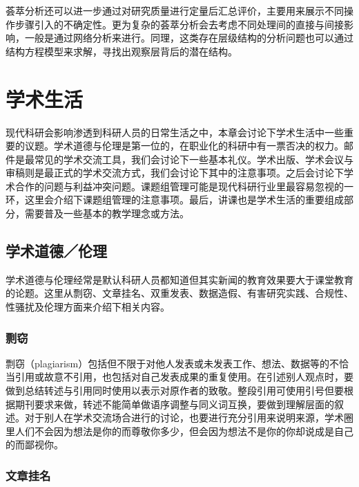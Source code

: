 \documentclass[]{tufte-book}
\begin{document}
荟萃分析还可以进一步通过对研究质量进行定量后汇总评价，主要用来展示不同操作步骤引入的不确定性。更为复杂的荟萃分析会去考虑不同处理间的直接与间接影响，一般是通过网络分析来进行。同理，这类存在层级结构的分析问题也可以通过结构方程模型来求解，寻找出观察层背后的潜在结构。

\hypertarget{life}{%
\chapter{学术生活}\label{life}}

现代科研会影响渗透到科研人员的日常生活之中，本章会讨论下学术生活中一些重要的议题。学术道德与伦理是第一位的，在职业化的科研中有一票否决的权力。邮件是最常见的学术交流工具，我们会讨论下一些基本礼仪。学术出版、学术会议与审稿则是最正式的学术交流方式，我们会讨论下其中的注意事项。之后会讨论下学术合作的问题与利益冲突问题。课题组管理可能是现代科研行业里最容易忽视的一环，这里会介绍下课题组管理的注意事项。最后，讲课也是学术生活的重要组成部分，需要普及一些基本的教学理念或方法。

\hypertarget{ux5b66ux672fux9053ux5fb7ux4f26ux7406}{%
\section{学术道德／伦理}\label{ux5b66ux672fux9053ux5fb7ux4f26ux7406}}

学术道德与伦理经常是默认科研人员都知道但其实新闻的教育效果要大于课堂教育的论题。这里从剽窃、文章挂名、双重发表、数据造假、有害研究实践、合规性、性骚扰及伦理方面来介绍下相关内容。

\hypertarget{ux527dux7a83}{%
\subsection{剽窃}\label{ux527dux7a83}}

剽窃（plagiarism）包括但不限于对他人发表或未发表工作、想法、数据等的不恰当引用或故意不引用，也包括对自己发表成果的重复使用。在引述别人观点时，要做到总结转述与引用同时使用以表示对原作者的致敬。整段引用可使用引号但要根据期刊要求来做，转述不能简单做语序调整与同义词互换，要做到理解层面的叙述。对于别人在学术交流场合进行的讨论，也要进行充分引用来说明来源，学术圈里人们不会因为想法是你的而尊敬你多少，但会因为想法不是你的你却说成是自己的而鄙视你。

\hypertarget{ux6587ux7ae0ux6302ux540d}{%
\subsection{文章挂名}\label{ux6587ux7ae0ux6302ux540d}}
\end{document}
